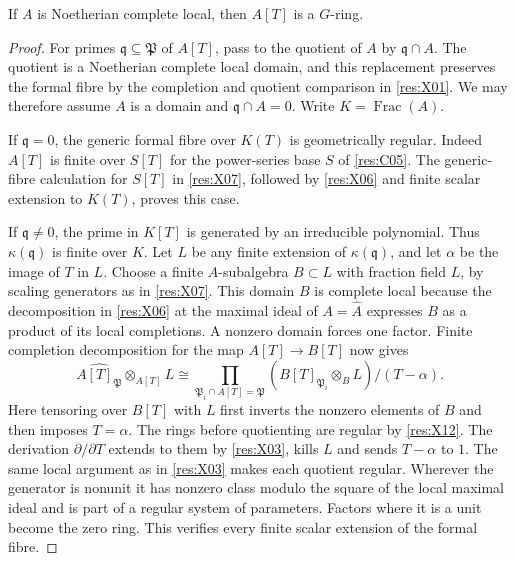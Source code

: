 \begin{lemma}\label{res:X13}
If \(A\) is Noetherian complete local, then \(A[T]\) is a \(G\)-ring.
\end{lemma}
\begin{proof}
For primes \(\mathfrak q\subseteq\mathfrak P\) of \(A[T]\), pass to the quotient of \(A\) by \(\mathfrak q\cap A\). The quotient is a Noetherian complete local domain, and this replacement preserves the formal fibre by the completion and quotient comparison in \ref{res:X01}. We may therefore assume \(A\) is a domain and \(\mathfrak q\cap A=0\). Write \(K=\operatorname{Frac}(A)\).

If \(\mathfrak q=0\), the generic formal fibre over \(K(T)\) is geometrically regular. Indeed \(A[T]\) is finite over \(S[T]\) for the power-series base \(S\) of \ref{res:C05}. The generic-fibre calculation for \(S[T]\) in \ref{res:X07}, followed by \ref{res:X06} and finite scalar extension to \(K(T)\), proves this case.

If \(\mathfrak q\ne0\), the prime in \(K[T]\) is generated by an irreducible polynomial. Thus \(\kappa(\mathfrak q)\) is finite over \(K\). Let \(L\) be any finite extension of \(\kappa(\mathfrak q)\), and let \(\alpha\) be the image of \(T\) in \(L\). Choose a finite \(A\)-subalgebra \(B\subset L\) with fraction field \(L\), by scaling generators as in \ref{res:X07}. This domain \(B\) is complete local because the decomposition in \ref{res:X06} at the maximal ideal of \(A=\widehat A\) expresses \(B\) as a product of its local completions. A nonzero domain forces one factor. Finite completion decomposition for the map \(A[T]\to B[T]\) now gives
\[
 \widehat{A[T]_{\mathfrak P}}\otimes_{A[T]}L
  \cong
  \prod_{\mathfrak P_i\cap A[T]=\mathfrak P}
       \left(\widehat{B[T]_{\mathfrak P_i}}\otimes_B L\right)/(T-\alpha).
\]
Here tensoring over \(B[T]\) with \(L\) first inverts the nonzero elements of \(B\) and then imposes \(T=\alpha\). The rings before quotienting are regular by \ref{res:X12}. The derivation \(\partial/\partial T\) extends to them by \ref{res:X03}, kills \(L\) and sends \(T-\alpha\) to \(1\). The same local argument as in \ref{res:X03} makes each quotient regular. Wherever the generator is nonunit it has nonzero class modulo the square of the local maximal ideal and is part of a regular system of parameters. Factors where it is a unit become the zero ring. This verifies every finite scalar extension of the formal fibre.
\end{proof}

